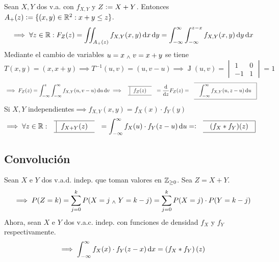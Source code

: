 \begin{ejem}
	Sean $X, Y$ dos v.a. con $f_{X, Y}$ y $Z \vcentcolon= X + Y$. Entonces $A_+(z) \vcentcolon= \{(x, y) \in \mathbb{R}^2 : x+y \leq z\}$.
	\[\implies \forall z \in \R : F_Z(z) = \iint_{A_+(z)} f_{X, Y}(x, y) \odif{x} \odif{y} = \int_{-\infty}^{\infty} \int_{-\infty}^{z-x} f_{X, Y}(x, y) \odif{y} \odif{x}\]
	Mediante el cambio de variables $u = x \; _{\wedge} \; v = x+y$ se tiene
	\[T(x, y) = (x, x+y) \implies T^{-1}(u, v) = (u, v-u) \implies \operatorname{J}(u, v) = \begin{vmatrix} 1 & 0 \\ -1 & 1\end{vmatrix} = 1\]
	\[\implies F_Z(z) = \int_{-\infty}^{z} \int_{-\infty}^{\infty} f_{X, Y}(u, v-u) \odif{u} \odif{v} \implies \lbox{f_Z(z)} = \odv{}{z} F_Z(z) = \rbox{\ds \int_{-\infty}^{\infty} f_{X, Y}(u, z-u) \odif{u}}\]
	 Si $X, Y$ independientes$\implies f_{X, Y}(x, y) = f_X(x) \cdot f_Y(y)$
	\[\implies \forall z \in \R : \lbox{\ds f_{X+Y}(z)} = \int_{-\infty}^{\infty} f_X(u) \cdot f_Y(z-u) \odif{u} \eqdef \rbox{\ds (f_X * f_Y)(z)}\]
\end{ejem}


\subsection{Convolución}

Sean $X$ e $Y$ dos v.a.d. indep. que toman valores en $\mathbb{Z}_{\geq 0}$. Sea $Z = X + Y$.
\[\implies P(Z = k) = \sum_{j=0}^{k} P(X = j \; _{\wedge} \; Y = k-j) = \sum_{j=0}^{k} P(X = j) \cdot P(Y = k-j)\]
Ahora, sean $X$ e $Y$ dos v.a.c. indep. con funciones de densidad $f_X$ y $f_Y$ respectivamente.
\[\implies \int_{-\infty}^{\infty} f_{X}(x) \cdot f_{Y}(z-x) \odif{x} = \left(f_{X} * f_{Y}\right) (z)\] %

